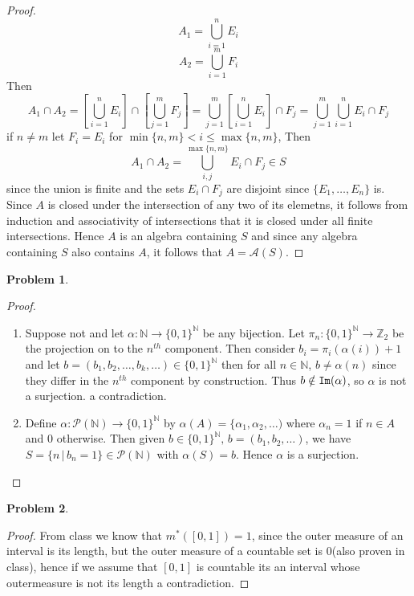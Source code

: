 \documentclass{article}
\newcommand{\Z}{\mathbb{Z}}
\newcommand{\N}{\mathbb{N}}
\newtheorem{prb}{Problem}
\begin{document}
\begin{proof}
	 \[ A_1 = \bigcup_{i = 1}^n E_i \] 
	 \[ A_2 = \bigcup_{i =1}^m F_i \] 
	 Then 
	 \begin{equation}
		 A_1 \cap A_2 = \left[ \bigcup_{i = 1}^n E_i \right] \cap \left[ \bigcup_{j=1}^m F_j \right]  
		 = \bigcup_{j = 1}^m \left[\bigcup_{i = 1}^n E_i\right] \cap F_j  
		 = \bigcup_{j=1 }^m \bigcup_{i =1}^n E_i \cap F_j
	 \end{equation}
	 if $n \neq m$ let $F_i = E_i$ for $\min\{n, m\} <  i \leq \max\{n, m\}$, Then 
	 \begin{equation}
		 A_1 \cap A_2 = \bigcup_{i, j}^{\max\{n, m\}} E_i \cap F_j \in S
	 \end{equation}
	since the union is finite and the sets $E_i \cap F_j$ are disjoint since $\{E_1, \dots, E_n\}$ is. Since $A$ is closed under the intersection of any two
	of its elemetns, it follows from induction and associativity of intersections that it is closed under all finite intersections. Hence $A$ is an 
	algebra containing $S$ and since any algebra containing $S$ also contains $A$, it follows that $A = \mathcal{A}(S)$. 
\end{proof} 

\begin{prb}  \end{prb} 
\begin{proof} 
	\begin{enumerate}
		\item Suppose not and let $\alpha:\mathbb{N} \to \{0, 1\}^{\N}$ be any bijection. 
			Let \newline $\pi_n:\{0, 1\}^{\N} \to \Z_2$ be the projection on to the $n^{th}$ component. Then consider 
			$	b_i = \pi_i(\alpha(i)) +1 	$ and let $b = (b_1, b_2, \dots, b_k, \dots) \in \{0, 1\}^{\N}$ 
			then for all $n \in \N$, $b \neq \alpha(n)$ since they 
			differ in the $n^{th}$ component by construction. Thus $b \notin {\tt Im}(\alpha)$, so $\alpha$ is not 
			a surjection. a contradiction. 

		\item 
			Define 
			$\alpha: \mathcal{P}(\N) \to \{0, 1\}^\N$ by $\alpha(A) = \{ \alpha_1, \alpha_2, \dots)$ where
			$\alpha_n = 1 $ if $n \in A$ and 0 otherwise. Then given $b \in \{0, 1\}^{\N}, 
			\, b = (b_1, b_2, \dots)$, we have $S = \{ n \, | \, b_n = 1\} \in \mathcal{P}(\N)$ with $\alpha(S) = b$. Hence
			$\alpha$ is a surjection. 
	\end{enumerate}
\end{proof} 

\begin{prb}  \end{prb} 
\begin{proof} 
	From class we know that $m^*([0,1]) = 1$, since 
	the outer measure of an interval is 
	its length, but the outer measure of a countable set is 0(also proven in class), hence if we assume that $[0, 1]$ is 
	countable its an interval whose outermeasure is not its length a contradiction. 
\end{proof} 
\end{document}
